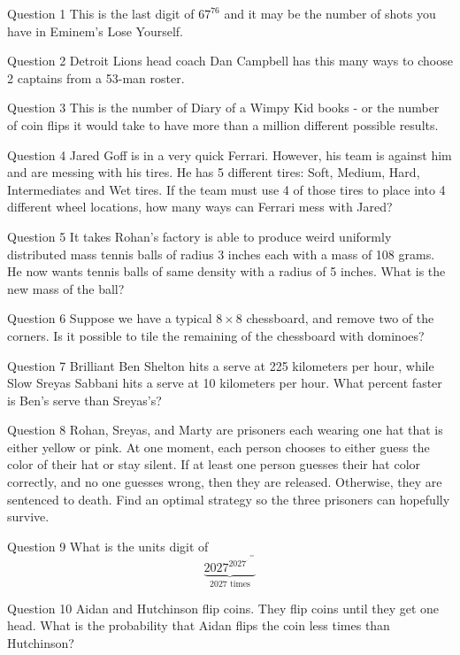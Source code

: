 \documentclass[aspectratio=169,xcolor=dvipsnames]{beamer}
\begin{document}
\begin{frame}[t]{Question 1}
    This is the last digit of $67^{76}$ and it may be the number of shots you have in Eminem's Lose Yourself.
\end{frame}

\begin{frame}[t]{Question 2}
    Detroit Lions head coach Dan Campbell has this many ways to choose 2 captains from a 53-man roster.
\end{frame}

\begin{frame}[t]{Question 3}
    This is the number of Diary of a Wimpy Kid books - or the number of coin flips it would take to have more than a million different possible results.
\end{frame}

\begin{frame}[t]{Question 4}
    Jared Goff is in a very quick Ferrari. However, his team is against him and are messing with his tires. He has 5 different tires: Soft, Medium, Hard, Intermediates and Wet tires. If the team must use 4 of those tires to place into 4 different wheel locations, how many ways can Ferrari mess with Jared?
\end{frame}

\begin{frame}[t]{Question 5}
    It takes Rohan's factory is able to produce weird uniformly distributed mass tennis balls of radius 3 inches each with a mass of 108 grams. He now wants tennis balls of same density with a radius of 5 inches. What is the new mass of the ball? 
\end{frame}

\begin{frame}[t]{Question 6}
    Suppose we have a typical $8\times 8$ chessboard, and remove two of the corners. Is it possible to tile the remaining of the chessboard with dominoes?
\end{frame}
\begin{frame}[t]{Question 7}
    Brilliant Ben Shelton hits a serve at 225 kilometers per hour, while  Slow Sreyas Sabbani hits a serve at 10 kilometers per hour. What percent faster is Ben’s serve than Sreyas’s?
\end{frame}

\begin{frame}[t]{Question 8}
     Rohan, Sreyas, and Marty are prisoners each wearing one hat that is either yellow or pink. At one moment, each person chooses to either guess the color of their hat or stay silent. If at least one person guesses their hat color correctly, and no one guesses wrong, then they are released. Otherwise, they are sentenced to death. Find an optimal strategy so the three prisoners can hopefully survive.
\end{frame}
\begin{frame}[t]{Question 9}
    What is the units digit of \[ \underbrace{2027^{2027^{\cdot^{\cdot^{\cdot^{2027}}}}}}_{\text{2027 times}}\]
\end{frame}
\begin{frame}[t]{Question 10}
    Aidan and Hutchinson flip coins. They flip coins until they get one head. What is the probability that Aidan flips the coin less times than Hutchinson?
\end{frame}
\end{document}
